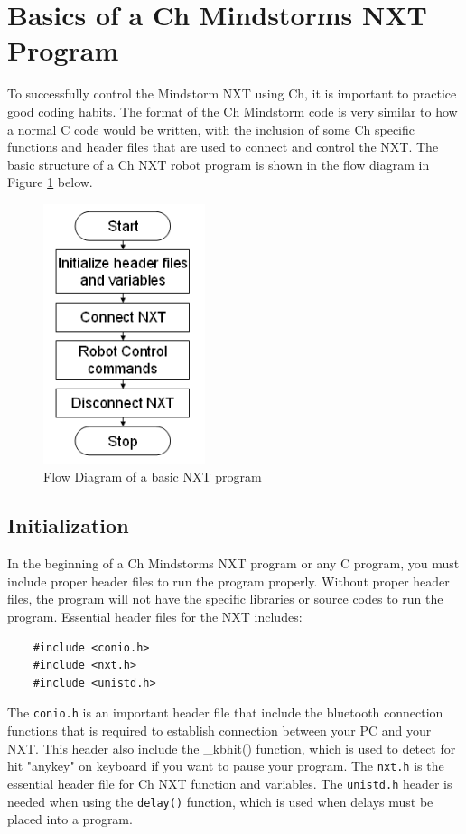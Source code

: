 \section{Basics of a Ch Mindstorms NXT Program}
To successfully control the Mindstorm NXT using Ch, it is 
important to practice good coding habits. The format of the Ch 
Mindstorm code is very similar to how a normal C code would be 
written, with the inclusion of some Ch specific functions and 
header files that are used to connect and control the NXT. The 
basic structure of a Ch NXT robot program is shown in the flow 
diagram in Figure \ref{fig_NXT_pstruc} below.\\
\begin{figure}[h!]
  \begin{center}
    \includegraphics[height=3in]{figure/mindstorm/NXT_pstruc.png}
    \caption{Flow Diagram of a basic NXT program\label{fig_NXT_pstruc}}
  \end{center}
\end{figure}
\subsection{Initialization}
In the beginning of a Ch Mindstorms NXT program or any C program,
you must include proper header files to run the program properly.
Without proper header files, the program will not have the 
specific libraries or source codes to run the program. Essential 
header files for the NXT includes:
\begin{verbatim}
    #include <conio.h>
    #include <nxt.h>
    #include <unistd.h>
\end{verbatim}
\noindent
The \verb+conio.h+ is an important header file that include the 
bluetooth connection functions that is required to establish 
connection between your PC and your NXT. This header also include
the \_kbhit() function, which is used to detect for hit "anykey" 
on keyboard if you want to pause your program. The \verb+nxt.h+ 
is the essential header file for Ch NXT function and variables.  
The \verb+unistd.h+ header is needed when using the 
\verb+delay()+ function, which is used when delays must be placed
into a program.

